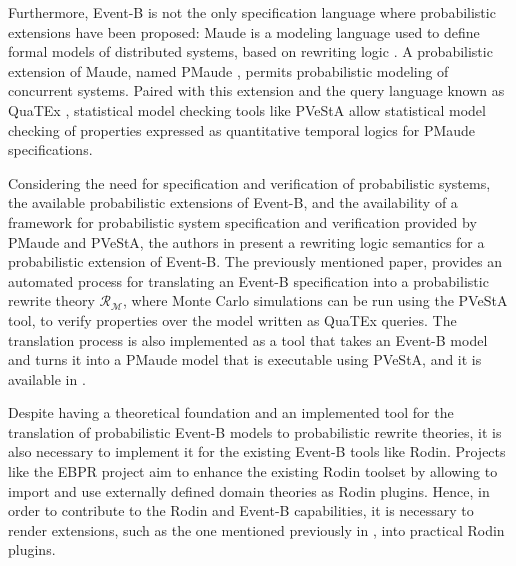 Furthermore, Event-B is not the only specification language where probabilistic extensions have been proposed: Maude \cite{Clavel2007} is a modeling language used to define formal models of distributed systems, based on rewriting logic \cite{Bruni2006}. A probabilistic extension of Maude, named PMaude \cite{Agha2006}, permits probabilistic modeling of concurrent systems. Paired with this extension and the query language known as QuaTEx \cite{Agha2006}, statistical model checking tools like PVeStA \cite{AlTurki2011} allow statistical model checking of properties expressed as quantitative temporal logics for PMaude specifications.

Considering the need for specification and verification of probabilistic systems, the available probabilistic extensions of Event-B, and the availability of a framework for probabilistic system specification and verification provided by PMaude and PVeStA,  the authors in \cite{Olarte} present a rewriting logic semantics for a probabilistic extension of Event-B. The previously mentioned paper, provides an automated process for translating an Event-B specification into a probabilistic rewrite theory $\mathscr{R}_\mathscr{M}$, where Monte Carlo simulations can be run using the PVeStA tool, to verify properties over the model written as QuaTEx queries. The translation process is also implemented as a tool that takes an Event-B model and turns it into a PMaude model that is executable using PVeStA, and it is available in \cite{tool.website}.

Despite having a theoretical foundation and an implemented tool for the translation of probabilistic Event-B models to probabilistic rewrite theories, it is also necessary to implement it for the existing Event-B tools like Rodin. Projects like the EBPR project \cite{EBRP} aim to enhance the existing Rodin toolset by allowing to import and use externally defined domain theories as Rodin plugins. Hence, in order to contribute to the Rodin and Event-B capabilities, it is necessary to render extensions, such as the one mentioned previously in \cite{Olarte}, into practical Rodin plugins.